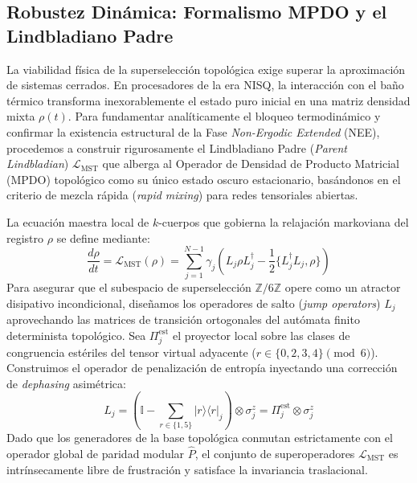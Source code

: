 \documentclass[12pt,a4paper]{article}
\theoremstyle{plain}
\theoremstyle{definition}
\theoremstyle{remark}
\begin{document}
\subsection{Robustez Dinámica: Formalismo MPDO y el Lindbladiano Padre}
\label{subsec:robustez_dinamica}

La viabilidad física de la superselección topológica exige superar la aproximación de sistemas cerrados. En procesadores de la era NISQ, la interacción con el baño térmico transforma inexorablemente el estado puro inicial en una matriz densidad mixta $\rho(t)$. Para fundamentar analíticamente el bloqueo termodinámico y confirmar la existencia estructural de la Fase \textit{Non-Ergodic Extended} (NEE), procedemos a construir rigurosamente el Lindbladiano Padre (\textit{Parent Lindbladian}) $\mathcal{L}_{\text{MST}}$ que alberga al Operador de Densidad de Producto Matricial (MPDO) topológico como su único estado oscuro estacionario, basándonos en el criterio de mezcla rápida (\textit{rapid mixing}) para redes tensoriales abiertas.

La ecuación maestra local de $k$-cuerpos que gobierna la relajación markoviana del registro $\rho$ se define mediante:
\begin{equation}
\frac{d\rho}{dt} = \mathcal{L}_{\text{MST}}(\rho) = \sum_{j=1}^{N-1} \gamma_j \left( L_j \rho L_j^\dagger - \frac{1}{2} \{ L_j^\dagger L_j, \rho \} \right)
\label{eq:lindblad_master}
\end{equation}
Para asegurar que el subespacio de superselección $\mathbb{Z}/6\mathbb{Z}$ opere como un atractor disipativo incondicional, diseñamos los operadores de salto (\textit{jump operators}) $L_j$ aprovechando las matrices de transición ortogonales del autómata finito determinista topológico. Sea $\Pi_j^{\text{est}}$ el proyector local sobre las clases de congruencia estériles del tensor virtual adyacente ($r \in \{0,2,3,4\} \pmod 6$). Construimos el operador de penalización de entropía inyectando una corrección de \textit{dephasing} asimétrica:
\begin{equation}
L_j = \left( \mathbb{I} - \sum_{r \in \{1,5\}} |r\rangle\langle r|_j \right) \otimes \sigma_j^z = \Pi_j^{\text{est}} \otimes \sigma_j^z
\label{eq:jump_operators}
\end{equation}
Dado que los generadores de la base topológica conmutan estrictamente con el operador global de paridad modular $\hat{P}$, el conjunto de superoperadores $\mathcal{L}_{\text{MST}}$ es intrínsecamente libre de frustración y satisface la invariancia traslacional.
\end{document}
